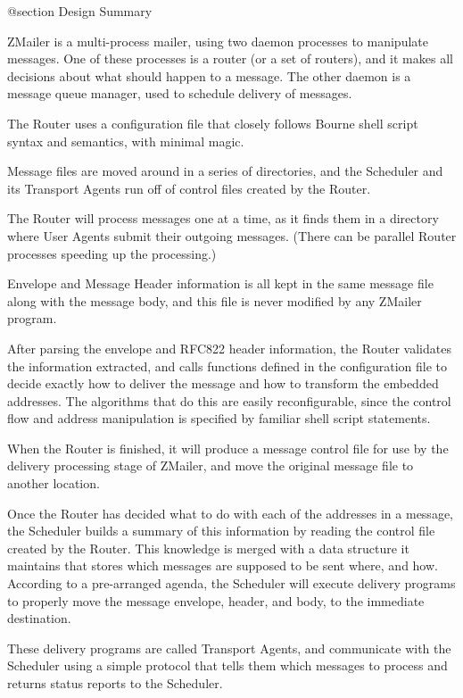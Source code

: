 @section Design Summary

ZMailer is a multi-process mailer, using two daemon processes
to manipulate messages.
One of these processes is a router (or a set of routers), and it
makes all decisions about what should happen to a message.
The other daemon is a message queue manager, used to schedule
delivery of messages.

The Router uses a configuration file that closely follows Bourne
shell script syntax and semantics, with minimal magic.

Message files are moved around in a series of directories,
and the Scheduler and its Transport Agents run off of control
files created by the Router.

The Router will process messages one at a time, as it finds them
in a directory where User Agents submit their outgoing messages.
(There can be parallel Router processes speeding up the processing.)

Envelope and Message Header information is all kept in the same
message file along with the message body, and this file is never
modified by any ZMailer program.

After parsing the envelope and RFC822 header information,
the Router validates the information extracted, and calls
functions defined in the configuration file to decide exactly
how to deliver the message and how to transform the embedded
addresses.
The algorithms that do this are easily reconfigurable, since
the control flow and address manipulation is specified by familiar
shell script statements.

When the Router is finished, it will produce a message control
file for use by the delivery processing stage of ZMailer, and
move the original message file to another location.

Once the Router has decided what to do with each of the addresses
in a message, the Scheduler builds a summary of this information
by reading the control file created by the Router.
This knowledge is merged with a data structure it maintains that
stores which messages are supposed to be sent where, and how.
According to a pre-arranged agenda, the Scheduler will execute
delivery programs to properly move the message envelope, header,
and body, to the immediate destination.

These delivery programs are called Transport Agents, and communicate
with the Scheduler using a simple protocol that tells them which
messages to process and returns status reports to the Scheduler.

